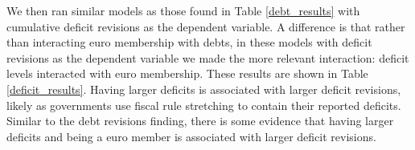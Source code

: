 \documentclass[]{article}
\begin{document}
We then ran similar models as those found in Table \ref{debt_results} with cumulative deficit revisions as the dependent variable. A difference is that rather than interacting euro membership with debts, in these models with deficit revisions as the dependent variable we made the more relevant interaction: deficit levels interacted with euro membership. These results are shown in Table \ref{deficit_results}. Having larger deficits is associated with larger deficit revisions, likely as governments use fiscal rule stretching to contain their reported deficits.  Similar to the debt revisions finding, there is some evidence that having larger deficits and being a euro member is associated with larger deficit revisions.

\begin{landscape}
    
\end{landscape}
\end{document}

